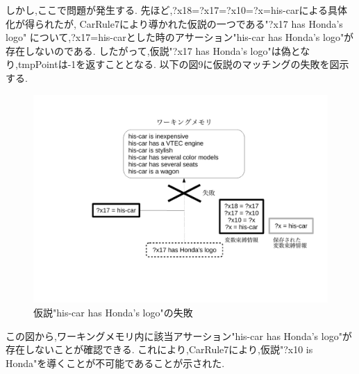 \documentclass[uplatex,12pt]{jsarticle}
\begin{document}
\newpage

しかし,ここで問題が発生する.
先ほど,?x18=?x17=?x10=?x=his-carによる具体化が得られたが,
CarRule7により導かれた仮説の一つである"?x17 has Honda's logo"
について,?x17=his-carとした時のアサーション"his-car has Honda's logo"が存在しないのである.
したがって,仮説"?x17 has Honda's logo"は偽となり,tmpPointは-1を返すこととなる.
以下の図9に仮説のマッチングの失敗を図示する.
\begin{figure}[!hbt]
    \centering
    \includegraphics[scale=0.30]{images/backward_chaining_5.pdf}
    \caption{仮説"his-car has Honda's logo"の失敗}
\end{figure}
この図から,ワーキングメモリ内に該当アサーション"his-car has Honda's logo"が存在しないことが確認できる.
これにより,CarRule7により,仮説"?x10 is Honda"を導くことが不可能であることが示された. \\
\end{document}
